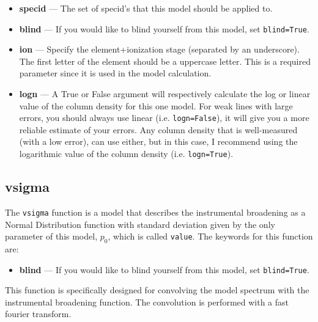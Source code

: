 \begin{itemize}
\item \textbf{specid} --- The set of specid's that this model should be applied to.
\item \textbf{blind} --- If you would like to blind yourself from this model, set \texttt{blind=True}.
\item \textbf{ion} --- Specify the element+ionization stage (separated by an underscore). The
first letter of the element should be a uppercase letter. This is a required parameter since it is
used in the model calculation.
\item \textbf{logn} --- A True or False argument will respectively calculate the log or linear
value of the column density for this one model. For weak lines with large errors, you should
always use linear (i.e. \texttt{logn=False}), it will give you a more reliable estimate of your
errors. Any column density that is well-measured (with a low error), can use either, but in
this case, I recommend using the logarithmic value of the column density (i.e. \texttt{logn=True}).
\end{itemize}


\subsection{vsigma}

The \texttt{vsigma} function is a model that describes the
instrumental broadening as a Normal Distribution function
with standard deviation given by the only parameter of this
model, $p_0$, which is called \texttt{value}.
The keywords for this function are:
\begin{itemize}
\item \textbf{blind} --- If you would like to blind yourself from this model, set \texttt{blind=True}.
\end{itemize}
This function is specifically designed for convolving the
model spectrum with the instrumental broadening function.
The convolution is performed with a fast fourier transform.

